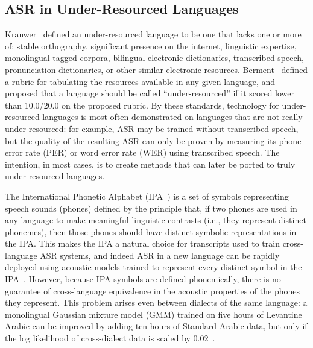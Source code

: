 \subsection{ASR in Under-Resourced Languages}

Krauwer~\cite{Krauwer2003} defined an under-resourced language to be
one that lacks one or more of: stable orthography, significant
presence on the internet, linguistic expertise, monolingual tagged
corpora, bilingual electronic dictionaries, transcribed speech,
pronunciation dictionaries, or other similar electronic resources.
Berment~\cite{Berment2004} defined a rubric for tabulating the
resources available in any given language, and proposed that a
language should be called ``under-resourced'' if it scored lower than
10.0/20.0 on the proposed rubric.  By these standards, technology
for under-resourced languages is most often demonstrated on
languages that are not really under-resourced: for example, ASR may be
trained without transcribed speech, but the quality of the resulting
ASR can only be proven by measuring its phone error
rate (PER) or word error rate (WER) using transcribed speech.  The
intention, in most cases, is to create methods that can later be
ported to truly under-resourced languages.

The International Phonetic Alphabet (IPA~\cite{ipa1993}) is a set of
symbols representing speech sounds (phones) defined by the principle
that, if two phones are used in any language to make meaningful
linguistic contrasts (i.e., they represent distinct phonemes), then
those phones should have distinct symbolic representations in the IPA.
This makes the IPA a natural choice for transcripts used to train
cross-language ASR systems, and indeed ASR in a new language can be 
rapidly deployed using acoustic models trained to represent every 
distinct symbol in the IPA~\cite{Schultz2001}.
However, because IPA symbols are defined phonemically, there is no
guarantee of cross-language equivalence in the acoustic properties of
the phones they represent. This problem arises even between dialects of
the same language: a monolingual Gaussian mixture model (GMM) trained on
five hours of Levantine Arabic can be improved by adding ten hours of
Standard Arabic data, but only if the log likelihood of cross-dialect
data is scaled by 0.02~\cite{Huang2012}.


